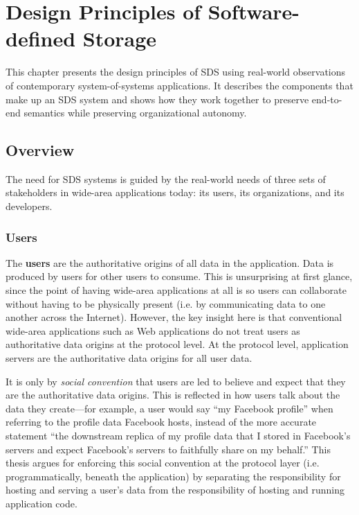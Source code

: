 \chapter{Design Principles of Software-defined Storage}
\label{chap:design_principles}

This chapter presents the design
principles of SDS using real-world observations of contemporary
system-of-systems applications.
It describes the components that make up an SDS system
and shows how they work together to preserve end-to-end semantics while
preserving organizational autonomy.

\section{Overview}

The need for SDS systems is guided by the real-world needs of three sets of stakeholders in
wide-area applications today:  its users, its organizations, and its developers.

\subsection{Users}

The \textbf{users} are the authoritative origins of all data in the application.
Data is produced by users for other users to consume.  This is unsurprising at
first glance, since the point of having wide-area applications at all is so users can
collaborate without having to be physically present 
(i.e. by communicating data to one another across the Internet).  However, the
key insight here is that conventional wide-area applications such as Web
applications do not treat users as authoritative data origins at the protocol
level.  At the protocol level, application servers are the authoritative data origins for
all user data. 

It is only by \emph{social convention} that users are led to believe and
expect that they are the authoritative data origins.  This is reflected in how
users talk about the data they create---for example, a user would say ``my
Facebook profile'' when referring to the profile data Facebook hosts, instead of the more accurate
statement ``the downstream replica of my profile data that I stored in Facebook's servers and
expect Facebook's servers to faithfully share on my behalf.''
This thesis argues for enforcing this
social convention at the protocol layer (i.e. programmatically, beneath the application)
by separating the responsibility for hosting
and serving a user's data from the responsibility of hosting and running
application code.

